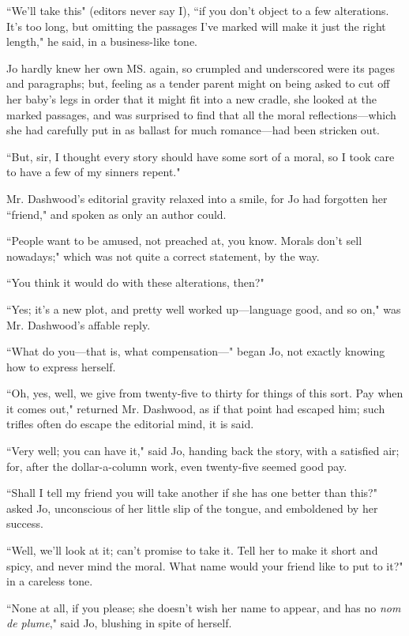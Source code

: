 ``We'll take this" (editors never say I), ``if you
don't object to a few alterations. It's
too long, but omitting the passages I've marked will
make it just the right length," he said, in a business-like tone.

Jo hardly knew her own MS. again, so crumpled and underscored were its
pages and paragraphs; but, feeling as a tender parent might on being
asked to cut off her baby's legs in order that it might
fit into a new cradle, she looked at the marked passages, and was
surprised to find that all the moral reflections---which she had
carefully put in as ballast for much romance---had been stricken out.

``But, sir, I thought every story should have some sort of a moral, so I
took care to have a few of my sinners repent."

Mr. Dashwood's editorial gravity relaxed into a smile,
for Jo had forgotten her ``friend," and spoken as only an author could.

``People want to be amused, not preached at, you know. Morals
don't sell nowadays;" which was not quite a correct
statement, by the way.

``You think it would do with these alterations, then?"

``Yes; it's a new plot, and pretty well worked
up---language good, and so on," was Mr. Dashwood's
affable reply.

``What do you---that is, what compensation---" began Jo, not exactly
knowing how to express herself.

``Oh, yes, well, we give from twenty-five to thirty for things of this
sort. Pay when it comes out," returned Mr. Dashwood, as if that point
had escaped him; such trifles often do escape the editorial mind, it is
said.

``Very well; you can have it," said Jo, handing back the story, with a
satisfied air; for, after the dollar-a-column work, even twenty-five
seemed good pay.

``Shall I tell my friend you will take another if she has one better than
this?" asked Jo, unconscious of her little slip of the tongue, and
emboldened by her success.

``Well, we'll look at it; can't promise
to take it. Tell her to make it short and spicy, and never mind the
moral. What name would your friend like to put to it?" in a careless
tone.

``None at all, if you please; she doesn't wish her name
to appear, and has no \emph{nom de plume}," said Jo, blushing in spite
of herself.

